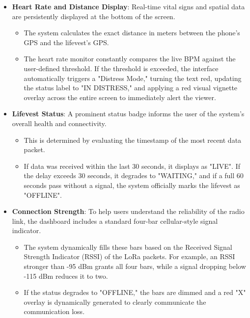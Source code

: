 \documentclass{article}
\begin{document}
\begin{itemize}
\item \textbf{Heart Rate and Distance Display}: Real-time vital signs and spatial data are persistently displayed at the bottom of the screen. 
\begin{itemize}
    \item The system calculates the exact distance in meters between the phone's GPS and the lifevest's GPS.
    \item The heart rate monitor constantly compares the live BPM against the user-defined threshold. If the threshold is exceeded, the interface automatically triggers a "Distress Mode," turning the text red, updating the status label to "IN DISTRESS," and applying a red visual vignette overlay across the entire screen to immediately alert the viewer.
\end{itemize}

\item \textbf{Lifevest Status}: A prominent status badge informs the user of the system's overall health and connectivity. 
\begin{itemize}
    \item This is determined by evaluating the timestamp of the most recent data packet. 
    \item If data was received within the last 30 seconds, it displays as "LIVE". If the delay exceeds 30 seconds, it degrades to "WAITING," and if a full 60 seconds pass without a signal, the system officially marks the lifevest as "OFFLINE".
\end{itemize}

\item \textbf{Connection Strength}: To help users understand the reliability of the radio link, the dashboard includes a standard four-bar cellular-style signal indicator. 
\begin{itemize}
    \item The system dynamically fills these bars based on the Received Signal Strength Indicator (RSSI) of the LoRa packets. For example, an RSSI stronger than -95 dBm grants all four bars, while a signal dropping below -115 dBm reduces it to two. 
    \item If the status degrades to "OFFLINE," the bars are dimmed and a red "X" overlay is dynamically generated to clearly communicate the communication loss.
\end{itemize}


\end{itemize}
\end{document}
